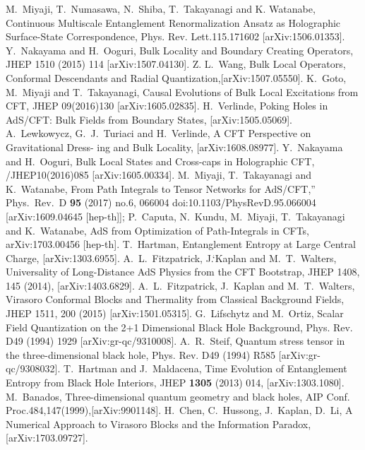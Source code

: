\documentclass[11pt,a4paper]{article}
\begin{document}
\begin{thebibliography}{}
M.~Miyaji, T.~Numasawa, N.~Shiba, T.~Takayanagi and K. Watanabe, Continuous Multiscale Entanglement Renormalization Ansatz as Holographic Surface-State Correspondence, Phys. Rev. Lett.115.171602 [arXiv:1506.01353].
Y.~Nakayama and H.~Ooguri, Bulk Locality and Boundary Creating Operators, JHEP 1510 (2015) 114 [arXiv:1507.04130].
Z. L.~Wang, Bulk Local Operators, Conformal Descendants and Radial Quantization,[arXiv:1507.05550].
K.~Goto, M.~Miyaji and T.~Takayanagi, Causal Evolutions of Bulk Local Excitations from CFT, JHEP 09(2016)130 [arXiv:1605.02835].
H.~Verlinde, Poking Holes in AdS/CFT: Bulk Fields from Boundary States, [arXiv:1505.05069].
A.~Lewkowycz, G.~J.~Turiaci and H.~Verlinde, A CFT Perspective on Gravitational Dress- ing and Bulk Locality, [arXiv:1608.08977].
Y.~Nakayama and H.~Ooguri, Bulk Local States and Cross-caps in Holographic CFT, /JHEP10(2016)085 [arXiv:1605.00334].
 M.~Miyaji, T.~Takayanagi and K.~Watanabe, From Path Integrals to Tensor Networks for AdS/CFT,''  Phys.\ Rev.\ D {\bf 95} (2017) no.6,  066004  doi:10.1103/PhysRevD.95.066004  [arXiv:1609.04645 [hep-th]];  %
P.~Caputa, N.~Kundu, M.~Miyaji, T.~Takayanagi and K.~Watanabe, AdS from Optimization of Path-Integrals in CFTs,  arXiv:1703.00456 [hep-th].  %
T.~Hartman, Entanglement Entropy at Large Central Charge, [arXiv:1303.6955].
A.~L.~Fitzpatrick, J.`Kaplan and M.~T.~Walters, Universality of Long-Distance AdS Physics from the CFT Bootstrap, JHEP 1408, 145 (2014), [arXiv:1403.6829].
A.~L.~Fitzpatrick, J.~Kaplan and M.~T.~Walters, Virasoro Conformal Blocks and Thermality from Classical Background Fields, JHEP 1511, 200 (2015) [arXiv:1501.05315].
G.~Lifschytz and M.~Ortiz, Scalar Field Quantization
on the 2+1 Dimensional Black Hole Background, Phys. Rev. D49 (1994) 1929 [arXiv:gr-qc/9310008].
A.~R.~Steif, Quantum stress tensor in the three-dimensional black hole, Phys. Rev. D49 (1994) R585 [arXiv:gr-qc/9308032].
  T.~Hartman and J.~Maldacena, Time Evolution of Entanglement Entropy from Black Hole Interiors, JHEP {\bf 1305} (2013) 014, [arXiv:1303.1080].%
M.~Banados, Three-dimensional quantum geometry and black holes, AIP Conf. Proc.484,147(1999),[arXiv:9901148].
H.~Chen, C.~Hussong, J.~Kaplan, D.~Li, A Numerical Approach to Virasoro 
Blocks and the Information Paradox, [arXiv:1703.09727].

\end{thebibliography}
\end{document}
